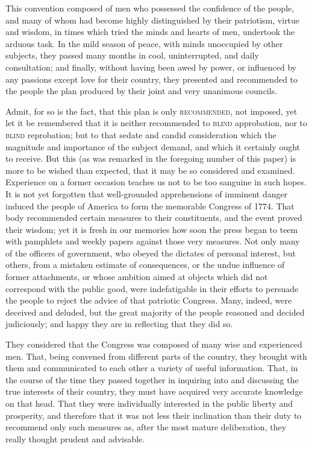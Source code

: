 This convention composed of men who possessed the confidence of the people, and many of whom had become highly distinguished by their patriotism, virtue and wisdom, in times which tried the minds and hearts of men, undertook the arduous task. In the mild season of peace, with minds unoccupied by other subjects, they passed many months in cool, uninterrupted, and daily consultation; and finally, without having been awed by power, or influenced by any passions except love for their country, they presented and recommended to the people the plan produced by their joint and very unanimous councils.

Admit, for so is the fact, that this plan is only \textsc{recommended}, not imposed, yet let it be remembered that it is neither recommended to \textsc{blind }approbation, nor to \textsc{blind }reprobation; but to that sedate and candid consideration which the magnitude and importance of the subject demand, and which it certainly ought to receive. But this (as was remarked in the foregoing number of this paper) is more to be wished than expected, that it may be so considered and examined. Experience on a former occasion teaches us not to be too sanguine in such hopes. It is not yet forgotten that well-grounded apprehensions of imminent danger induced the people of America to form the memorable Congress of 1774. That body recommended certain measures to their constituents, and the event proved their wisdom; yet it is fresh in our memories how soon the press began to teem with pamphlets and weekly papers against those very measures. Not only many of the officers of government, who obeyed the dictates of personal interest, but others, from a mistaken estimate of consequences, or the undue influence of former attachments, or whose ambition aimed at objects which did not correspond with the public good, were indefatigable in their efforts to persuade the people to reject the advice of that patriotic Congress. Many, indeed, were deceived and deluded, but the great majority of the people reasoned and decided judiciously; and happy they are in reflecting that they did so.

They considered that the Congress was composed of many wise and experienced men. That, being convened from different parts of the country, they brought with them and communicated to each other a variety of useful information. That, in the course of the time they passed together in inquiring into and discussing the true interests of their country, they must have acquired very accurate knowledge on that head. That they were individually interested in the public liberty and prosperity, and therefore that it was not less their inclination than their duty to recommend only such measures as, after the most mature deliberation, they really thought prudent and advisable.

